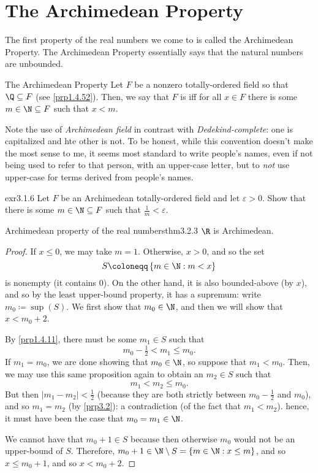 \section{The Archimedean Property}\label{sct3.2}

The first property of the real numbers we come to is called the Archimedean Property.  The Archimedean Property essentially says that the natural numbers are unbounded.
\begin{dfn}{The Archimedean Property}{}
Let $F$ be a nonzero totally-ordered field so that $\Q \subseteq F$ (see \cref{prp1.4.52}).  Then, we say that $F$ is  iff for all $x\in F$ there is some $m\in \N \subseteq F$ such that $x<m$.
\begin{rmk}
Note the use of \emph{Archimedean field} in contrast with \emph{Dedekind-complete}:  one is capitalized and hte other is not.  To be honest, while this convention doesn't make the most sense to me, it seems most standard to write people's names, even if not being used to refer to that person, with an upper-case letter, but to \emph{not} use upper-case for terms derived from people's names.
\end{rmk}
\end{dfn}
\begin{exr}{}{exr3.1.6}
Let $F$ be an Archimedean totally-ordered field and let $\varepsilon >0$.  Show that there is some $m\in \N \subseteq F$ such that $\frac{1}{m}<\varepsilon$.
\end{exr}
\begin{thm}{Archimedean property of the real numbers}{thm3.2.3}
$\R$ is Archimedean.
\begin{proof}
If $x\leq 0$, we may take $m=1$.  Otherwise, $x>0$, and so the set
\begin{equation}
S\coloneqq \left\{ m\in \N :m<x\right\} 
\end{equation}
is nonempty (it contains $0$).  On the other hand, it is also bounded-above (by $x$), and so by the least upper-bound property, it has a supremum:  write $m_0\coloneqq \sup (S)$.  We first show that $m_0\in \N$, and then we will show that $x<m_0+2$.

By \cref{prp1.4.11}, there must be some $m_1\in S$ such that
\begin{equation}
m_0-\tfrac{1}{2}<m_1\leq m_0.
\end{equation}
If $m_1=m_0$, we are done showing that $m_0\in \N$, so suppose that $m_1<m_0$.  Then, we may use this same proposition again to obtain an $m_2\in S$ such that
\begin{equation}
m_1<m_2\leq m_0.
\end{equation}
But then $|m_1-m_2|<\frac{1}{2}$ (because they are both strictly between $m_0-\frac{1}{2}$ and $m_0$), and so $m_1=m_2$ (by \cref{prp3.2}):  a contradiction (of the fact that $m_1<m_2$).  hence, it must have been the case that $m_0=m_1\in \N$.

We cannot have that $m_0+1\in S$ because then otherwise $m_0$ would not be an upper-bound of $S$.  Therefore, $m_0+1\in \N \setminus S=\left\{ m\in \N :x\leq m\right\}$, and so $x\leq m_0+1$, and so $x<m_0+2$.
\end{proof}
\end{thm}
